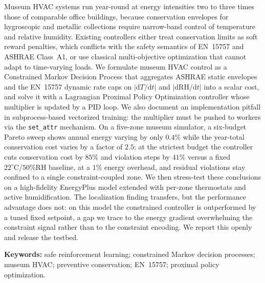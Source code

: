 \documentclass[11pt,a4paper]{article}
\begin{document}
Museum HVAC systems run year-round at energy intensities two to three
times those of comparable office buildings, because conservation
envelopes for hygroscopic and metallic collections require narrow-band
control of temperature and relative humidity. Existing controllers
either treat conservation limits as soft reward penalties, which
conflicts with the safety semantics of EN~15757 and ASHRAE Class~A1,
or use classical multi-objective optimization that cannot adapt to
time-varying loads. We formulate museum HVAC control as a Constrained
Markov Decision Process that aggregates ASHRAE static envelopes and the
EN~15757 dynamic rate caps on $|\mathrm{d}T/\mathrm{d}t|$ and
$|\mathrm{d}\mathrm{RH}/\mathrm{d}t|$ into a scalar cost, and solve it
with a Lagrangian Proximal Policy Optimization controller whose
multiplier is updated by a PID loop. We also document an implementation
pitfall in subprocess-based vectorized training: the multiplier must be
pushed to workers via the \texttt{set\_attr} mechanism. On a five-zone
museum simulator, a six-budget Pareto sweep shows annual energy varying
by only $0.4\%$ while the year-total conservation cost varies by a
factor of $2.5$; at the strictest budget the controller cuts
conservation cost by $85\%$ and violation steps by $41\%$ versus a fixed
$22^\circ\mathrm{C}/50\%\mathrm{RH}$ baseline, at a $1\%$ energy
overhead, and residual violations stay confined to a single
constraint-coupled zone. We then stress-test these conclusions on a
high-fidelity EnergyPlus model extended with per-zone thermostats and
active humidification. The localization finding transfers, but the
performance advantage does not: on this model the constrained controller
is outperformed by a tuned fixed setpoint, a gap we trace to the energy
gradient overwhelming the constraint signal rather than to the
constraint encoding. We report this openly and release the testbed.

\vspace{6pt}\noindent\textbf{Keywords:}
safe reinforcement learning;
constrained Markov decision processes;
museum HVAC;
preventive conservation;
EN~15757;
proximal policy optimization.

\end{document}

